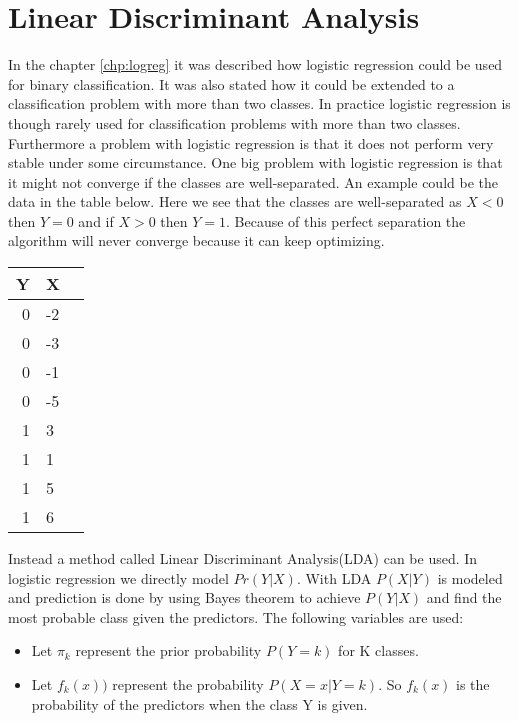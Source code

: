 \chapter{Linear Discriminant Analysis}
\label{chp:lindisana}

In the chapter \ref{chp:logreg} it was described how logistic regression could be used for binary classification. It was also stated how it could be extended to  a classification problem with more than two classes. In practice logistic regression is though rarely used for classification problems with more than two classes. Furthermore a problem with logistic regression is that it does not perform very stable under some circumstance. One big problem with logistic regression is that it might not converge if the classes are well-separated. An example could be the data in the table below. Here we see that the classes are well-separated as $X<0$ then $Y=0$ and if $X>0$ then $Y=1$. Because of this perfect separation the algorithm will never converge because it can keep optimizing.
\begin{center} 
	\begin{tabular}{rll}
		\multicolumn{1}{c}{\textbf{Y}} &
		\multicolumn{1}{c}{\textbf{X}} \\ \hline
		0     &  -2  \\[0.05cm] 
		0     &  -3  \\[0.05cm] 
		0     &  -1  \\[0.05cm] 
		0     &  -5  \\[0.05cm] 
		1     &    3  \\[0.05cm] 
		1     &    1  \\[0.05cm] 
		1     &    5  \\[0.05cm] 
		1     &    6  \\[0.05cm] 
	\end{tabular}
\end{center}

Instead a method called Linear Discriminant Analysis(LDA) can be used. In logistic regression we directly model $Pr(Y|X)$. With LDA $P(X|Y)$ is modeled and prediction is done by using Bayes theorem to achieve $P(Y|X)$ and find the most probable class given the predictors. The following variables are used:

\begin{itemize}
	\item Let $\pi_k$ represent the prior probability $P(Y=k)$ for K classes.
	\item Let $f_k(x))$ represent the probability $P(X=x|Y=k)$. So $f_k(x)$ is the probability of the predictors when the class Y is given.
\end{itemize} 

